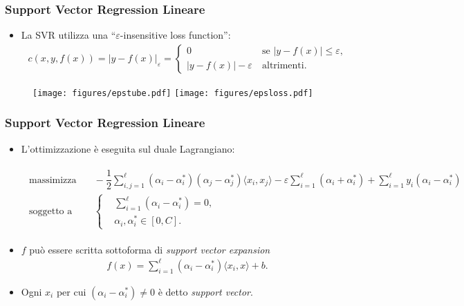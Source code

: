\documentclass[table]{beamer}
\newcommand{\nologo}{\setbeamertemplate{logo}{}}
\begin{document}
{\nologo
\begin{frame}
\frametitle{Support Vector Regression Lineare}
\begin{itemize}
\item La SVR utilizza una ``$ \varepsilon $-insensitive loss function'':
\begin{align*}
c(x,y,f(x)) = \vert y - f(x) \vert_{\varepsilon} = \begin{cases}
0 &\ \text{se } \vert y - f(x) \vert \leq \varepsilon \text{,}\\
\vert y - f(x) \vert - \varepsilon &\ \text{altrimenti} \text{.}
\end{cases}
\end{align*}
\end{itemize}
\begin{figure}[h]
  	\centering
  	\texttt{[image: figures/epstube.pdf]}
  	\texttt{[image: figures/epsloss.pdf]}
\end{figure}
\end{frame}}

\begin{frame}
\frametitle{Support Vector Regression Lineare}
\begin{itemize}
\item L'ottimizzazione è eseguita sul duale Lagrangiano:
\begin{scriptsize}
\begin{align*}
\begin{aligned}
\text{massimizza} &\quad
-\dfrac{1}{2}\sum_{i,j=1}^{\ell}(\alpha_{i} - \alpha_{i}^{*})(\alpha_{j} - \alpha_{j}^{*})\langle x_{i},x_{j} \rangle -\varepsilon\sum_{i=1}^{\ell}(\alpha_{i} + \alpha_{i}^{*}) + \sum_{i=1}^{\ell}y_{i}(\alpha_{i}-\alpha_{i}^{*}) \\
\text{soggetto a} &\quad \left\{\begin{aligned}
&\sum_{i=1}^{\ell}(\alpha_{i} - \alpha_{i}^{*}) = 0 \text{,}\\
&\alpha_{i},\alpha_{i}^{*} \in [0,C] \text{.}
\end{aligned}\right.
\end{aligned}
\end{align*}
\end{scriptsize}
\item $ f $ può essere scritta sottoforma di \textit{support vector expansion}
\begin{align*}
f(x) = \sum_{i=1}^{\ell}(\alpha_{i}-\alpha_{i}^{*})\langle x_{i},x\rangle + b \text{.}
\end{align*}
\item Ogni $ x_{i} $ per cui $ (\alpha_{i}-\alpha_{i}^{*}) \neq 0 $ è detto \textit{support vector}.
\end{itemize}
\end{frame}
\end{document}
